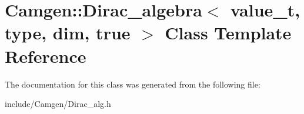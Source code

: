\hypertarget{a00127}{}\section{Camgen\+:\+:Dirac\+\_\+algebra$<$ value\+\_\+t, type, dim, true $>$ Class Template Reference}
\label{a00127}


The documentation for this class was generated from the following file\+:\begin{DoxyCompactItemize}
\item 
include/\+Camgen/Dirac\+\_\+alg.\+h\end{DoxyCompactItemize}
